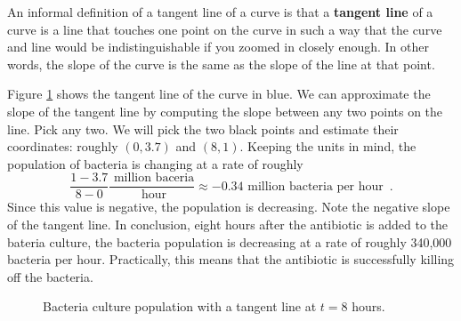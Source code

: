 An informal definition of a tangent line of a curve is that a {\bf tangent line} of a curve is a line that touches one point on the curve in such a way that the curve and line would be indistinguishable if you zoomed in closely enough. In other words, the slope of the curve is the same as the slope of the line at that point.

\begin{solution}
Figure \ref{fig:2-2-bacteria-tangent} shows the tangent line of the curve in blue. We can approximate the slope of the tangent line by computing the slope between any two points on the line. Pick any two. We will pick the two black points and estimate their coordinates: roughly $(0, 3.7)$ and $(8, 1)$. Keeping the units in mind, the population of bacteria is changing at a rate of roughly
$$\frac{1-3.7}{8-0} \frac{\mbox{ million baceria}}{\mbox{ hour}} \approx -0.34 \mbox{ million bacteria per hour} \enspace .$$
Since this value is negative, the population is decreasing. Note the negative slope of the tangent line. In conclusion, eight hours after the antibiotic is added to the bateria culture, the bacteria population is decreasing at a rate of roughly 340,000 bacteria per hour. Practically, this means that the antibiotic is successfully killing off the bacteria.
\end{solution}
\begin{figure}[ht!]
\centering
{}
\caption{Bacteria culture population with a tangent line at $t=8$ hours.}
\label{fig:2-2-bacteria-tangent}
\end{figure}


